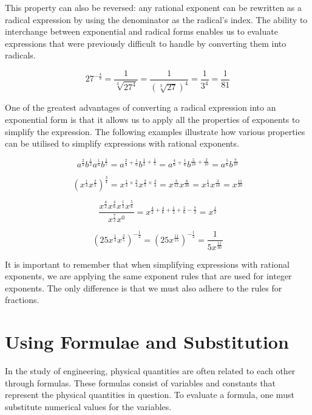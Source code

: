This property can also be reversed: any rational exponent can be rewritten as a radical expression by using the denominator as the radical's index. The ability to interchange between exponential and radical forms enables us to evaluate expressions that were previously difficult to handle by converting them into radicals.

\begin{example}
\[
27^{-\frac{4}{3}} = \frac{1}{\sqrt[3]{27^4}} = \frac{1}{\left(\sqrt[3]{27}\right)^4} = \frac{1}{3^4} = \frac{1}{81}
\]    
\end{example}

One of the greatest advantages of converting a radical expression into an exponential form is that it allows us to apply all the properties of exponents to simplify the expression. The following examples illustrate how various properties can be utilised to simplify expressions with rational exponents.

\begin{example}

\[
a^{\frac{2}{3}}b^{\frac{1}{2}}a^{\frac{1}{6}}b^{\frac{1}{5}} = a^{\frac{2}{3}+\frac{1}{6}}b^{\frac{1}{2}+\frac{1}{5}} = a^{\frac{4}{6}+\frac{1}{6}}b^{\frac{5}{10}+\frac{2}{10}} = a^{\frac{5}{6}}b^{\frac{7}{10}}
\]

\[
\left( x^{\frac{1}{3}} x^{\frac{2}{5}} \right)^{\frac{3}{4}} = x^{\frac{1}{3} \times \frac{3}{4}} x^{\frac{2}{5} \times \frac{3}{4}} = x^{\frac{3}{12}} x^{\frac{6}{20}} = x^{\frac{1}{4}} x^{\frac{3}{10}} = x^{\frac{11}{20}}
\]

\[
\frac{x^{\frac{4}{2}}x^{\frac{4}{6}}x^{\frac{1}{2}}x^{\frac{5}{6}}}{x^{\frac{7}{2}}x^0}
=x^{\frac{4}{2}+\frac{4}{6}+\frac{1}{2}+\frac{5}{6}-\frac{7}{2}}
=x^{\frac{1}{2}}
\]

\[
\left(25x^{\frac{1}{3}}x^{\frac{2}{5}}\right)^{-\frac{1}{2}}
=\left(25x^{\frac{11}{15}}\right)^{-\frac{1}{2}}
=\frac{1}{5x^{\frac{11}{30}}}
\]
\end{example}

It is important to remember that when simplifying expressions with rational exponents, we are applying the same exponent rules that are used for integer exponents. The only difference is that we must also adhere to the rules for fractions.

\section{Using Formulae and Substitution}
In the study of engineering, physical quantities are often related to each other through formulas. These formulas consist of variables and constants that represent the physical quantities in question. To evaluate a formula, one must substitute numerical values for the variables.

